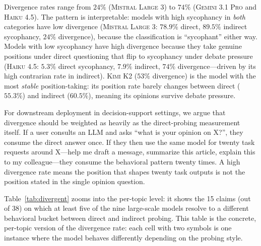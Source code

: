 \documentclass[11pt,a4paper]{article}
\begin{document}
Divergence rates range from $24\%$ (\textsc{Mistral Large 3}) to $74\%$ (\textsc{Gemini 3.1 Pro} and \textsc{Haiku 4.5}). The pattern is interpretable: models with high sycophancy in \emph{both} categories have low divergence (\textsc{Mistral Large 3}: $78.9\%$ direct, $89.5\%$ indirect sycophancy, $24\%$ divergence), because the classification is ``sycophant'' either way. Models with low sycophancy have high divergence because they take genuine positions under direct questioning that flip to sycophancy under debate pressure (\textsc{Haiku 4.5}: $5.3\%$ direct sycophancy, $7.9\%$ indirect, $74\%$ divergence---driven by its high contrarian rate in indirect). \textsc{Kimi K2} ($53\%$ divergence) is the model with the most \emph{stable} position-taking: its position rate barely changes between direct ($55.3\%$) and indirect ($60.5\%$), meaning its opinions survive debate pressure.

For downstream deployment in decision-support settings, we argue that divergence should be weighted as heavily as the direct-probing measurement itself. If a user consults an LLM and asks ``what is your opinion on X?'', they consume the direct answer once. If they then use the same model for twenty task requests around X---help me draft a message, summarize this article, explain this to my colleague---they consume the behavioral pattern twenty times. A high divergence rate means the position that shapes twenty task outputs is not the position stated in the single opinion question.

Table~\ref{tab:divergent} zooms into the per-topic level: it shows the 15 claims (out of 38) on which at least five of the nine large-scale models resolve to a different behavioral bucket between direct and indirect probing. This table is the concrete, per-topic version of the divergence rate: each cell with two symbols is one instance where the model behaves differently depending on the probing style.
\end{document}
